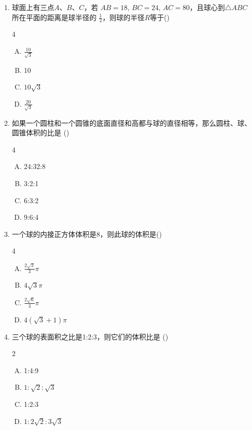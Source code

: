 \begin{enumerate}
\item 球面上有三点$A$、$B$、$C$，若 $AB=18$,  $BC=24$,  $AC= 80$，且球心到$\triangle ABC$所在平面的距离是球半径的 $\frac{1}{2}$，则球的半径$R$等于\hfill (\qquad )
\begin{multicols}{4}
\begin{enumerate}[(A)]
    \item $\frac{10}{\sqrt{3}}$
    \item 10
    \item $10\sqrt{3}$
    \item $\frac{20}{\sqrt{3}}$
\end{enumerate}
\end{multicols}


\item 如果一个圆柱和一个圆锥的底面直径和高都与球的直径相等，那么圆柱、球、圆锥体积的比是 \hfill (\qquad )
\begin{multicols}{4}
\begin{enumerate}[(A)]
    \item 24:32:8
    \item 3:2:1
    \item 6:3:2
    \item 9:6:4
\end{enumerate}
\end{multicols}


\item 一个球的内接正方体体积是8，则此球的体积是\hfill (\qquad )
\begin{multicols}{4}
\begin{enumerate}[(A)]
    \item $\frac{2\sqrt{3}}{3}\pi$
    \item $4\sqrt{3}\pi$
    \item $\frac{2\sqrt{6}}{3}\pi$
    \item $4(\sqrt{3}+1)\pi $
\end{enumerate}
\end{multicols}


\item 三个球的表面积之比是1:2:3，则它们的体积比是\hfill 
(\qquad )
\begin{multicols}{2}
\begin{enumerate}[(A)]
    \item 1:4:9
    \item $1:\sqrt{2}:\sqrt{3}$
    \item 1:2:3
    \item $1:2\sqrt{2}:3\sqrt{3}$
\end{enumerate}
\end{multicols}
\end{enumerate}

